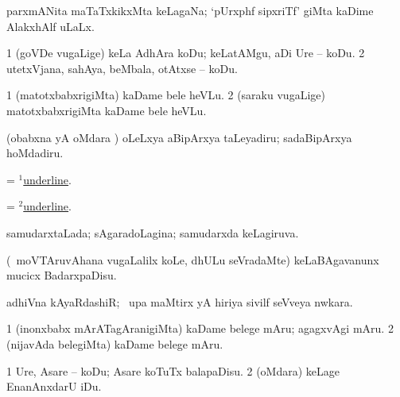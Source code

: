 \bentry
{} 
\gl{\gu}
\expl{}
\bmng
 parxmANita maTaTxkikxMta keLagaNa; `pUrxphf sipxriTf' giMta kaDime AlakxhAlf uLaLx. 
\emng
\eentry

\bentry
{} 
\gl{\sakirx}
\bmng
\bnum
\num{1} (goVDe \mo vugaLige) keLa AdhAra koDu; keLatAMgu, aDi Ure -- koDu. 
\num{2} utetxVjana, sahAya, beMbala, otAtxse -- koDu. 
\enum
\emng
\eentry

\bentry
{} 
\gl{\sakirx}
\expl{}
\bmng
\bnum
\num{1} (matotxbabxrigiMta) kaDame bele heVLu. 
\num{2} (saraku \mo vugaLige) matotxbabxrigiMta kaDame bele heVLu. 
\enum
\emng
\eentry

\bentry
{} 
\gl{\sakirx}
\expl{}
\bmng
 (obabxna yA oMdara \vi) oLeLxya aBipArxya taLeyadiru; sadaBipArxya hoMdadiru. 
\emng
\eentry

\bentry
{} 
\gl{\sakirx}
\expl{}
\bmng
 = \hyperlink{underline(1)}{$^1$underline}. 
\emng
\eentry

\bentry
{} 
\gl{\nA}
\expl{}
\bmng
 = \hyperlink{underline(2)}{$^2$underline}. 
\emng
\eentry

\bentry
{} 
\gl{\gu}
\expl{}
\bmng
 samudarxtaLada; sAgaradoLagina; samudarxda keLagiruva. 
\emng
\eentry

\bentry
{} 
\gl{\sakirx}
\expl{}
\bmng
 (\kanmu\ moVTAruvAhana \mo vugaLalilx koLe, dhULu seVradaMte) keLaBAgavanunx mucicx BadarxpaDisu. 
\emng
\eentry

\bentry
{} 
\gl{\nA}
\bmng
 adhiVna kAyaRdashiR; \kanmu\ upa maMtirx yA hiriya sivilf seVveya nwkara. 
\emng
\eentry

\bentry
{} 
\gl{\sakirx}
\expl{}
\bmng
\bnum
\num{1} (inonxbabx mArATagAranigiMta) kaDame belege mAru; agagxvAgi mAru. 
\num{2} (nijavAda belegiMta) kaDame belege mAru. 
\enum
\emng
\eentry

\bentry
{} 
\gl{\sakirx}
\bmng
\bnum
\num{1} Ure, Asare -- koDu; Asare koTuTx balapaDisu. 
\num{2} (oMdara) keLage EnanAnxdarU iDu. 
\enum
\emng
\eentry

